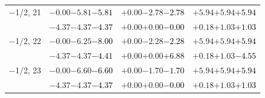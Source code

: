 \documentclass[compress]{beamer}
\begin{document}
\begin{frame}
\begin{tabular}{r | c | c | c}
$-$1/2, 21 & $-0.00$\hspace{0.1 cm}$-5.81$\hspace{0.1 cm}\textcolor{black}{$-5.81$} & $+0.00$\hspace{0.1 cm}$-2.78$\hspace{0.1 cm}\textcolor{black}{$-2.78$} & $+5.94$\hspace{0.1 cm}$+5.94$\hspace{0.1 cm}\textcolor{black}{$+5.94$} \\
           & $-4.37$\hspace{0.1 cm}$-4.37$\hspace{0.1 cm}\textcolor{black}{$-4.37$} & $+0.00$\hspace{0.1 cm}$+0.00$\hspace{0.1 cm}\textcolor{black}{$-0.00$} & $+0.18$\hspace{0.1 cm}$+1.03$\hspace{0.1 cm}\textcolor{black}{$+1.03$} \\
$-$1/2, 22 & $-0.00$\hspace{0.1 cm}$-6.25$\hspace{0.1 cm}\textcolor{black}{$-8.00$} & $+0.00$\hspace{0.1 cm}$-2.28$\hspace{0.1 cm}\textcolor{black}{$-2.28$} & $+5.94$\hspace{0.1 cm}$+5.94$\hspace{0.1 cm}\textcolor{black}{$+5.94$} \\
           & $-4.37$\hspace{0.1 cm}$-4.37$\hspace{0.1 cm}\textcolor{black}{$-4.41$} & $+0.00$\hspace{0.1 cm}$+0.00$\hspace{0.1 cm}\textcolor{black}{$+6.88$} & $+0.18$\hspace{0.1 cm}$+1.03$\hspace{0.1 cm}\textcolor{black}{$-4.55$} \\
$-$1/2, 23 & $-0.00$\hspace{0.1 cm}$-6.60$\hspace{0.1 cm}\textcolor{black}{$-6.60$} & $+0.00$\hspace{0.1 cm}$-1.70$\hspace{0.1 cm}\textcolor{black}{$-1.70$} & $+5.94$\hspace{0.1 cm}$+5.94$\hspace{0.1 cm}\textcolor{black}{$+5.94$} \\
           & $-4.37$\hspace{0.1 cm}$-4.37$\hspace{0.1 cm}\textcolor{black}{$-4.37$} & $+0.00$\hspace{0.1 cm}$+0.00$\hspace{0.1 cm}\textcolor{black}{$-0.00$} & $+0.18$\hspace{0.1 cm}$+1.03$\hspace{0.1 cm}\textcolor{black}{$+1.03$} \\

\end{tabular}
\end{frame}
\end{document}
